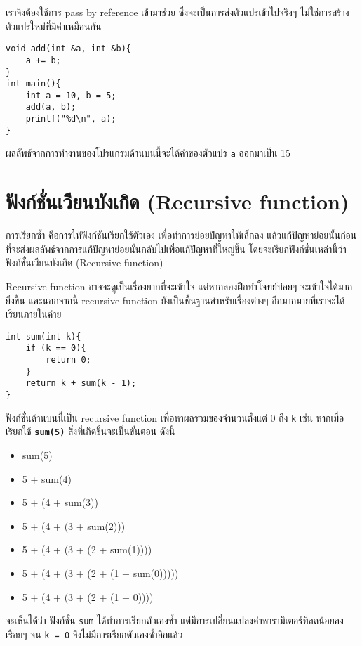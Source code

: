 เราจึงต้องใช้การ pass by reference เข้ามาช่วย ซึ่งจะเป็นการส่งตัวแปรเข้าไปจริงๆ ไม่ใช่การสร้างตัวแปรใหม่ที่มีค่าเหมือนกัน
\begin{lstlisting}
void add(int &a, int &b){
	a += b;
}
int main(){
	int a = 10, b = 5;
	add(a, b);
	printf("%d\n", a);
}
\end{lstlisting}
ผลลัพธ์จากการทำงานของโปรแกรมด้านบนนี้จะได้ค่าของตัวแปร \texttt{a} ออกมาเป็น 15

\section{ฟังก์ชั่นเวียนบังเกิด (Recursive function)}
การเรียกซ้ำ คือการให้ฟังก์ชั่นเรียกใช้ตัวเอง เพื่อทำการย่อยปัญหาให้เล็กลง แล้วแก้ปัญหาย่อยนั้นก่อนที่จะส่งผลลัพธ์จากการแก้ปัญหาย่อยนั้นกลับไปเพื่อแก้ปัญหาที่ใหญ่ขึ้น โดยจะเรียกฟังก์ชั่นเหล่านี้ว่า ฟังก์ชั่นเวียนบังเกิด (Recursive function)

Recursive function อาจจะดูเป็นเรื่องยากที่จะเข้าใจ แต่หากลองฝึกทำโจทย์บ่อยๆ จะเข้าใจได้มากยิ่งขึ้น และนอกจากนี้ recursive function ยังเป็นพื้นฐานสำหรับเรื่องต่างๆ อีกมากมายที่เราจะได้เรียนภายในค่าย
\begin{lstlisting}
int sum(int k){
	if (k == 0){
		return 0;
	}
	return k + sum(k - 1);
}
\end{lstlisting}
ฟังก์ชั่นด้านบนนี้เป็น recursive function เพื่อหาผลรวมของจำนวนตั้งแต่ 0 ถึง \texttt{k} เช่น หากเมื่อเรียกใช้ \textbf{\texttt{sum(5)}} สิ่งที่เกิดขึ้นจะเป็นขั้นตอน ดังนี้
\begin{itemize}
\item sum(5)
\item 5 + sum(4)
\item 5 + (4 + sum(3))
\item 5 + (4 + (3 + sum(2)))
\item 5 + (4 + (3 + (2 + sum(1))))
\item 5 + (4 + (3 + (2 + (1 + sum(0)))))
\item 5 + (4 + (3 + (2 + (1 + 0))))
\end{itemize}
จะเห็นได้ว่า ฟังก์ชั่น \texttt{sum} ได้ทำการเรียกตัวเองซ้ำ แต่มีการเปลี่ยนแปลงค่าพารามิเตอร์ที่ลดน้อยลงเรื่อยๆ จน \texttt{k = 0} จึงไม่มีการเรียกตัวเองซ้ำอีกแล้ว

